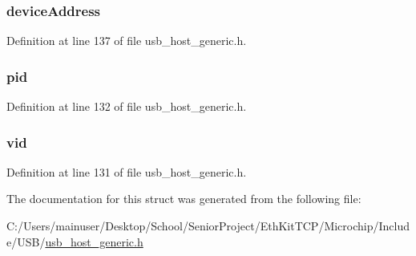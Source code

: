 \subsubsection[{device\+Address}]{ device\+Address}\label{struct___g_e_n_e_r_i_c___d_e_v_i_c_e___i_d_aa1d659071a17ee8d0172d34d6783b517}


Definition at line 137 of file usb\+\_\+host\+\_\+generic.\+h.

\hypertarget{struct___g_e_n_e_r_i_c___d_e_v_i_c_e___i_d_a718a3b94d880d84d1532ae6411eb60cc}{}
\subsubsection[{pid}]{ pid}\label{struct___g_e_n_e_r_i_c___d_e_v_i_c_e___i_d_a718a3b94d880d84d1532ae6411eb60cc}


Definition at line 132 of file usb\+\_\+host\+\_\+generic.\+h.

\hypertarget{struct___g_e_n_e_r_i_c___d_e_v_i_c_e___i_d_a9fcc011b7b6427b55322964f2d01781f}{}
\subsubsection[{vid}]{ vid}\label{struct___g_e_n_e_r_i_c___d_e_v_i_c_e___i_d_a9fcc011b7b6427b55322964f2d01781f}


Definition at line 131 of file usb\+\_\+host\+\_\+generic.\+h.



The documentation for this struct was generated from the following file\+:\begin{DoxyCompactItemize}
\item 
C\+:/\+Users/mainuser/\+Desktop/\+School/\+Senior\+Project/\+Eth\+Kit\+T\+C\+P/\+Microchip/\+Include/\+U\+S\+B/\hyperlink{usb__host__generic_8h}{usb\+\_\+host\+\_\+generic.\+h}\end{DoxyCompactItemize}
